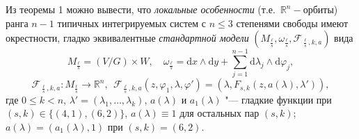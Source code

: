 Из теоремы 1 можно вывести, что {\em локальные особенности} (т.е.\ $\mathbb{R}^n-$орбиты) ранга $n-1$ типичных интегрируемых систем с $n\le3$ степенями свободы имеют окрестности, гладко эквивалентные {\em  стандартной модели} $(M_{\frac\ell s},\omega_{\frac\ell s},\mathcal{F}_{\frac\ell s,k,a})$ вида
$$
M_{\frac\ell s}=(V/G)\times W, \quad
\omega_{\frac\ell s} = \mathrm dx\wedge\mathrm dy + \sum_{j=1}^{n-1}\mathrm d\lambda_j\wedge\mathrm  d\varphi_j,
$$
$$
\mathcal{F}_{\frac\ell s,k,a}:M_{\frac\ell s}
\to \mathbb R^n,\ \ \mathcal{F}_{\frac\ell s,k,a}(z,\varphi_1,\lambda,\varphi')=(\lambda,{F_{s,k}}(z,a(\lambda),\lambda')),
$$
где $0\le k<n$, $\lambda'=(\lambda_1,\dots,\lambda_k)$,
$a(\lambda)$ и $a_1(\lambda)$ "--- гладкие функции при $(s,k)\in\{(4,1),(6,2)\}$,
$a(\lambda)\equiv1$ для остальных пар $(s,k)$;
$a(\lambda)=(a_1(\lambda),1)$ при $(s,k)=(6,2)$.





%

